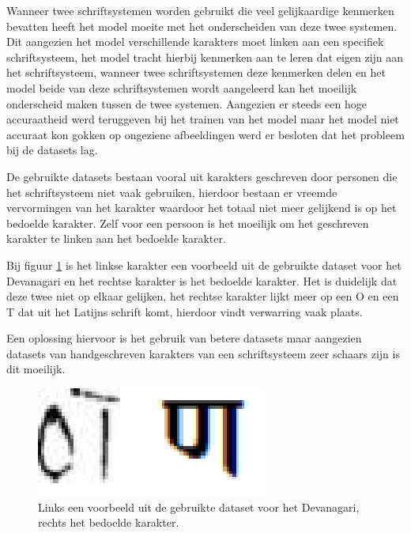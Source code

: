 Wanneer twee schriftsystemen worden gebruikt die veel gelijkaardige kenmerken bevatten heeft het model moeite met het onderscheiden van deze twee systemen.
Dit aangezien het model verschillende karakters moet linken aan een specifiek schriftsysteem, het model tracht hierbij kenmerken aan te leren dat eigen zijn aan het schriftsysteem, wanneer twee schriftsystemen deze kenmerken delen en het model beide van deze schriftsystemen wordt aangeleerd kan het moeilijk onderscheid maken tussen de twee systemen.
Aangezien er steeds een hoge accuraatheid werd teruggeven bij het trainen van het model maar het model niet accuraat kon gokken op ongeziene afbeeldingen werd er besloten dat het probleem bij de datasets lag. 

De gebruikte datasets bestaan vooral uit karakters geschreven door personen die het schriftsysteem niet vaak gebruiken, hierdoor bestaan er vreemde vervormingen van het karakter waardoor het totaal niet meer gelijkend is op het bedoelde karakter.
Zelf voor een persoon is het moeilijk om het geschreven karakter te linken aan het bedoelde karakter.

Bij figuur \ref{tab:compare} is het linkse karakter een voorbeeld uit de gebruikte dataset voor het Devanagari en het rechtse karakter is het bedoelde karakter. Het is duidelijk dat deze twee niet op elkaar gelijken, het rechtse karakter lijkt meer op een O en een T dat uit het Latijns schrift komt, hierdoor vindt verwarring vaak plaats.

Een oplossing hiervoor is het gebruik van betere datasets maar aangezien datasets van handgeschreven karakters van een schriftsysteem zeer schaars zijn is dit moeilijk.


\begin{figure}
    
    \centering
    \includegraphics[scale=0.9]{img/vergelijking.png}
    
    \caption{Links een voorbeeld uit de gebruikte dataset voor het Devanagari, rechts het bedoelde karakter.}
    \label{tab:compare}
    
\end{figure}


